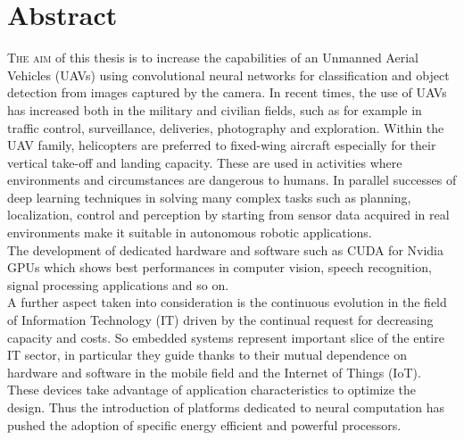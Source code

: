 \chapter*{Abstract}
\label{chap:abstract}
%
%
\lettrine[lines=3]{T}{he aim} of this thesis is to increase the capabilities of
an Unmanned Aerial Vehicles (UAVs) using convolutional neural networks for
classification and object detection from images captured by the camera.
In recent times, the use of UAVs has increased both in the military and civilian
fields, such as for example in traffic control, surveillance, deliveries,
photography and exploration.
Within the UAV family, helicopters are preferred to fixed-wing aircraft
especially for their vertical take-off and landing capacity.
These are used in activities where environments and circumstances are dangerous
to humans.
In parallel successes of deep learning techniques in solving many complex tasks
such as planning, localization, control and perception by starting from sensor
data acquired in real environments make it suitable in autonomous robotic
applications.\\
The development of dedicated hardware and software such as CUDA for Nvidia GPUs
which shows best performances in computer vision, speech recognition,
signal processing applications and so on.\\
A further aspect taken into consideration is the continuous evolution in the
field of Information Technology (IT) driven by the continual request for
decreasing capacity and costs.
So embedded systems represent important slice of the entire IT sector, in
particular they guide thanks to their mutual dependence on hardware and software
in the mobile field and the Internet of Things (IoT).\\
These devices take advantage of application characteristics to optimize the
design. Thus the introduction of platforms dedicated to neural computation has
pushed the adoption of specific energy efficient and powerful processors.\\

